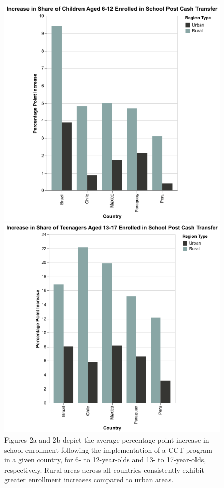 \documentclass[
  10pt,
]{article}
\begin{document}
\begin{figure}

\begin{minipage}{0.50\linewidth}
\includegraphics{pictures/change_enrollment6_12yo.png}\end{minipage}%
%
\begin{minipage}{0.50\linewidth}
\includegraphics{pictures/change_enrollment13_17yo.png}\end{minipage}%

\caption{\label{fig-combined}Figures 2a and 2b depict the average
percentage point increase in school enrollment following the
implementation of a CCT program in a given country, for 6- to
12-year-olds and 13- to 17-year-olds, respectively. Rural areas across
all countries consistently exhibit greater enrollment increases compared
to urban areas.}

\end{figure}%
\end{document}
